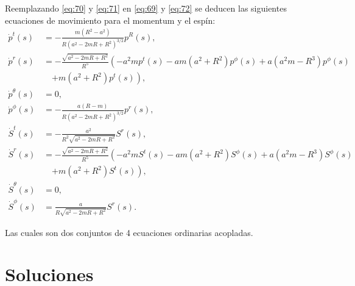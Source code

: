 Reemplazando \eqref{eq:70} y \eqref{eq:71} en \eqref{eq:69} y \eqref{eq:72} se deducen las siguientes ecuaciones de movimiento para el momentum y el espín:
\begin{align}
\dot{p}^t(s) &= -\frac{m(R^2-a^2)}{R(a^2-2mR+R^2)^{3/2}} p^R(s),\\
\nonumber
\dot{p}^r(s) &= -\frac{\sqrt{a^2-2mR+R^2}}{R^5} \left( -a^{2}m p^t(s) - a m \left(a^{2} + R^{2}\right) p^{\phi}(s) + a \left(a^{2} m - R^{3}\right) p^{\phi}(s) \right.\\
& \quad \left. + m \left(a^{2} + R^{2} \right) p^t(s) \right),\\
\dot{p}^{\theta}(s) &= 0,\\
\dot{p}^{\phi}(s) &= -\frac{a(R-m)}{R(a^2-2mR+R^2)^{3/2}} p^r(s),\\
\dot{S}^t(s) &= -\frac{a^2}{R^2 \sqrt{a^2-2mR + R^2}} S^r(s),\\
\nonumber
\dot{S}^r(s) &= -\frac{\sqrt{a^2-2mR+R^2}}{R^5} \left( - a^{2} m S^t(s) - a m \left(a^{2} + R^{2}\right) S^{\phi}(s) + a \left(a^{2} m - R^{3}\right) S^{\phi}(s) \right.\\
& \quad \left. + m \left(a^{2} + R^{2} \right) S^t(s) \right),\\
\dot{S}^{\theta}(s) &= 0,\\
\dot{S}^{\phi}(s) &= \frac{a}{R\sqrt{a^2-2mR+R^2}} S^r(s).
\end{align} 

Las cuales son dos conjuntos de 4 ecuaciones ordinarias acopladas.

\section{Soluciones}

